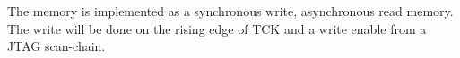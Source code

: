 The memory is implemented as a synchronous write, asynchronous read memory. The write will be done on the rising edge of TCK and a write enable from a JTAG scan-chain. 